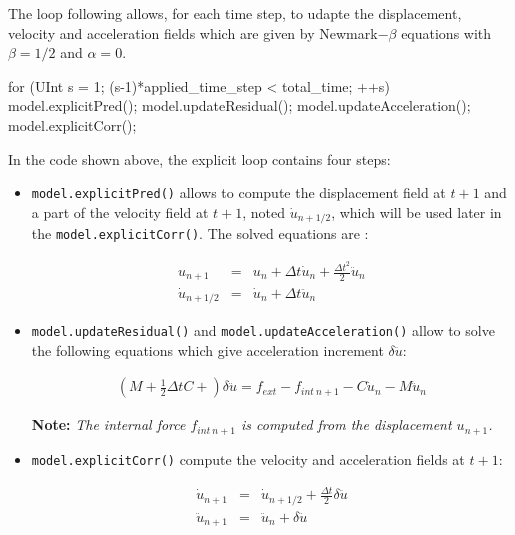 \documentclass[a4paper,11pt]{book}
\newcommand{\code}[1]{\texttt{#1}}
\newcommand{\note}[1]{\textbf{Note: }\textit{#1}}
\begin{document}
The loop following allows, for each time step, to udapte the displacement, velocity 
and acceleration fields which are given by Newmark$-\beta$ equations with $\beta=1/2$ 
and $\alpha=0$.

\begin{cpp}
  for (UInt s = 1; (s-1)*applied_time_step < total_time; ++s) {
    model.explicitPred();
    model.updateResidual();
    model.updateAcceleration();
    model.explicitCorr();
  }
\end{cpp}

In the code shown above, the explicit loop contains four steps:
\begin{itemize}
\item \code{model.explicitPred()} allows to compute the displacement field at $t+1$ and a 
part of the velocity field at $t+1$, noted $\dot{u}_{n+1/2}$, which will be used later in 
the \code{model.explicitCorr()}. The solved equations are :

\begin{eqnarray}
  u_{n+1}        &=& u_{n} +  \Delta t \dot{u}_{n} + \frac{\Delta t^2}{2} \ddot{u}_{n} \\
  \dot{u}_{n+1/2}  &=& \dot{u}_{n} +  \Delta t  \ddot{u}_{n}
  \label{eqn:smm:explicit:onehalfvelocity}
\end{eqnarray}

\item \code{model.updateResidual()} and \code{model.updateAcceleration()} allow to 
solve the following equations which give acceleration increment $\delta \ddot{u}$:

\begin{eqnarray}
 (M + \frac{1}{2} \Delta t C + ) \delta \ddot{u} = f_{ext} - f_{int~n+1} - C \dot{u}_{n} - M \ddot{u}_{n}
\end{eqnarray}

\note{The internal force $f_{int~n+1}$ is computed from the displacement $u_{n+1}$.} 

\item \code{model.explicitCorr()} compute the velocity and acceleration fields at $t+1$:

\begin{eqnarray}
\dot{u}_{n+1}  &=& \dot{u}_{n+1/2} + \frac{\Delta t}{2} \delta \ddot{u} \\
\ddot{u}_{n+1}  &=& \ddot{u}_{n} +  \delta \ddot{u}
\end{eqnarray}

\end{itemize}
\end{document}
